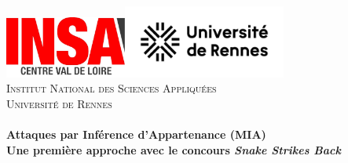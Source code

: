 \begin{titlepage}
    \begin{center}
        \includegraphics[width=0.30\textwidth]{figures/logos/Logo_INSA_CVL}\hspace{0.5cm}\includegraphics[width=0.40\textwidth]{figures/logos/Logo_UniversitéDeRennes}\\[0.9cm]

        \textsc{\LARGE Institut National des Sciences Appliquées}\\[0.35cm]
        \textsc{\LARGE Université de Rennes}\\[1.5cm]

        \HRule \\[0.4cm]

            {\huge \bfseries Attaques par Inférence d'Appartenance (MIA)\\[0.15cm]
            \Large Une première approche avec le concours \textit{Snake Strikes Back}\\[0.4cm]}


\end{center}
\end{titlepage}
